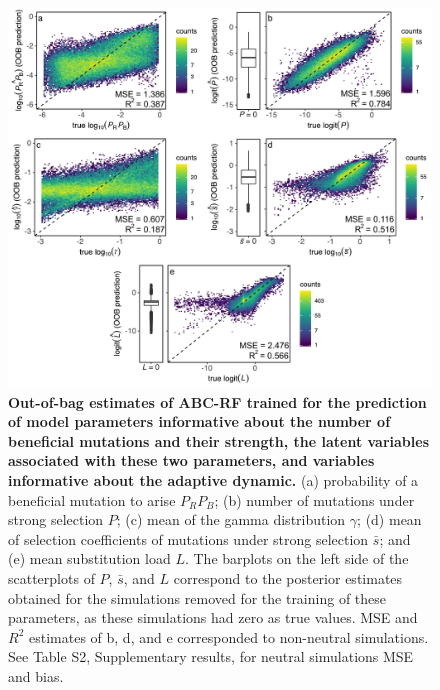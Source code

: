\documentclass[a4paper, 12pt]{article}
\begin{document}
\begin{figure}[ht]
  \centering
  \includegraphics[width=1\textwidth]{Figures/FigureS2_oob_plots_selection.pdf}
  \small\caption{\textbf{Out-of-bag estimates of ABC-RF trained for the prediction of model parameters informative about the number of beneficial mutations and their strength, the latent variables associated with these two parameters, and variables informative about the adaptive dynamic.} (a) probability of a beneficial mutation to arise $P_RP_B$; (b) number of mutations under strong selection $P$; (c)  mean of the gamma distribution $\gamma$; (d) mean of selection coefficients of mutations under strong selection $\bar{s}$; and (e) mean substitution load $L$. The barplots on the left side of the scatterplots of $P$, $\bar{s}$, and $L$ correspond to the posterior estimates obtained for the simulations removed for the training of these parameters, as these simulations had zero as true values. MSE and $R^2$ estimates of b, d, and e corresponded to non-neutral simulations. See Table S2, Supplementary results, for neutral simulations MSE and bias.}
  \label{fig:supple_oob_sel}
\end{figure}
\end{document}
